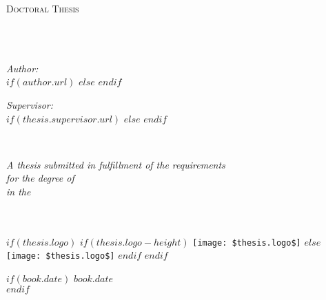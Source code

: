   \begin{titlepage}
  \begin{center}
  
  \vspace*{.06\textheight}
  {\scshape\LARGE \univname\par}\vspace{1.5cm} %
  \textsc{\Large Doctoral Thesis}\\[0.5cm] %
  
  \HRule \\[0.4cm] %
  {\huge \bfseries \ttitle\par}\vspace{0.4cm} %
  \HRule \\[1.5cm] %
   
  \begin{minipage}[t]{0.4\textwidth}
  \begin{flushleft} \large
  \emph{Author:}\\
  $if(author.url)$
  \href{$author.url$}{\authorname} %
  $else$
  \authorname
  $endif$
  \end{flushleft}
  \end{minipage}
  \begin{minipage}[t]{0.4\textwidth}
  \begin{flushright} \large
  \emph{Supervisor:} \\ 
  $if(thesis.supervisor.url)$%
  \href{$thesis.supervisor.url$}{\supname} %
  $else$%
  \supname
  $endif$
  \end{flushright}
  \end{minipage}\\[3cm]
   
  \vfill
  
  \large \textit{A thesis submitted in fulfillment of the requirements\\ for the degree of \degreename}\\[0.3cm] %
  \textit{in the}\\[0.4cm]
  \groupname\\
  \deptname\\[2cm] %
   
  \vfill
  
  $if(thesis.logo)$
  $if(thesis.logo-height)$
  \texttt{[image: \$thesis.logo\$]} %
  $else$
  \texttt{[image: \$thesis.logo\$]}
  $endif$
  $endif$
  
  $if(book.date)$
  {\large $book.date$}\\[4cm] %
  $endif$
  
  \vfill
  \end{center}
  \end{titlepage}
\fi
\makeatother


